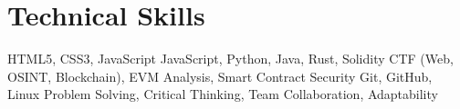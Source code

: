 \section{\textbf{Technical Skills}}
\vspace{-0.4mm}
 \resumeHeadingSkillStart
    {HTML5, CSS3, JavaScript}
    {JavaScript, Python, Java, Rust, Solidity}
    {CTF (Web, OSINT, Blockchain), EVM Analysis, Smart Contract Security}
    {Git, GitHub, Linux}
    {Problem Solving, Critical Thinking, Team Collaboration, Adaptability}
 \resumeHeadingSkillEnd
